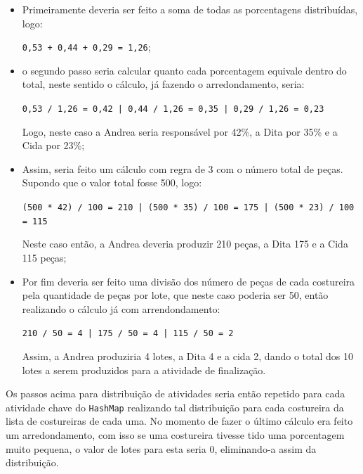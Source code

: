 \begin{itemize}
	\item Primeiramente deveria ser feito a soma de todas as porcentagens distribuídas, logo: 
	\par \texttt{0,53 + 0,44 + 0,29 = 1,26};
	
	\item o segundo passo seria calcular quanto cada porcentagem equivale dentro do total, neste 
	sentido o cálculo, já fazendo o arredondamento, seria: 
	\par \texttt{0,53 / 1,26 = 0,42 | 0,44 / 1,26 = 0,35 | 0,29 / 1,26 = 0,23}
	\par Logo, neste caso a Andrea seria responsável por 42\%, a Dita por 35\% e a Cida por 23\%;
	
	\item Assim, seria feito um cálculo com regra de 3 com o número total de peças. Supondo que o 
	 valor total fosse 500, logo:
	
	\par \texttt{(500 * 42) / 100 = 210 | (500 * 35) / 100 = 175 | (500 * 23) / 100 = 115}
	
	\par Neste caso então, a Andrea deveria produzir 210 peças, a Dita 175 e a Cida 115 peças;
	
	\item Por fim deveria ser feito uma divisão dos número de peças de cada costureira pela quantidade
     de peças por lote, que neste caso poderia ser 50, então realizando o cálculo já com arrendondamento:
     \par \texttt{210 / 50 = 4 | 175 / 50 = 4 | 115 / 50 = 2}
     
     \par Assim, a Andrea produziria 4 lotes, a Dita 4 e a cida 2, dando o total dos 10 lotes a serem produzidos
     para a atividade de finalização.
	
\end{itemize}
 
 \par Os passos acima para distribuição de atividades seria então repetido para cada atividade chave do \texttt{HashMap}
 realizando tal distribuição para cada costureira da lista de costureiras de cada uma. No momento de fazer o último 
 cálculo era feito um arredondamento, com isso se uma costureira tivesse tido uma porcentagem muito pequena, o valor 
 de lotes para esta seria 0, eliminando-a assim da distribuição.
 
